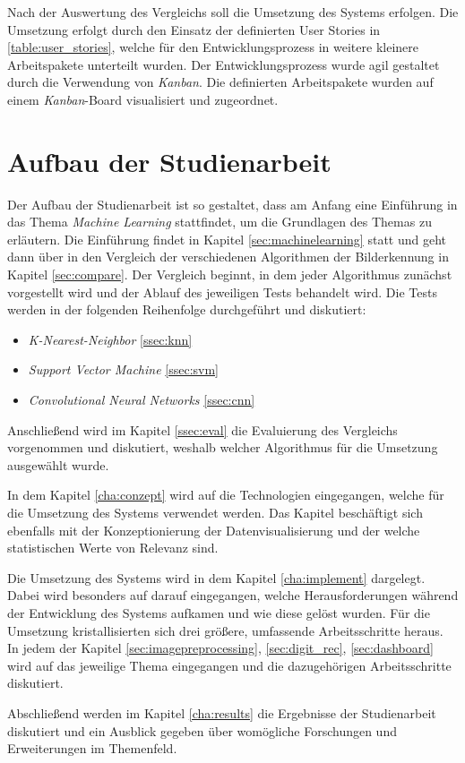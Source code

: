 Nach der Auswertung des Vergleichs soll die Umsetzung des Systems erfolgen. Die Umsetzung erfolgt durch den Einsatz der definierten User Stories in \ref{table:user_stories}, welche für den Entwicklungsprozess in weitere kleinere Arbeitspakete unterteilt wurden. Der Entwicklungsprozess wurde agil gestaltet durch die Verwendung von \textit{Kanban}. Die definierten Arbeitspakete wurden auf einem \textit{Kanban}-Board visualisiert und zugeordnet.

\section{Aufbau der Studienarbeit}
Der Aufbau der Studienarbeit ist so gestaltet, dass am Anfang eine Einführung in das Thema \textit{Machine Learning} stattfindet, um die Grundlagen des Themas zu erläutern. Die Einführung findet in Kapitel \ref{sec:machinelearning} statt und geht dann über in den Vergleich der verschiedenen Algorithmen der Bilderkennung in Kapitel \ref{sec:compare}. Der Vergleich beginnt, in dem jeder Algorithmus zunächst vorgestellt wird und der Ablauf des jeweiligen Tests behandelt wird. Die Tests werden in der folgenden Reihenfolge durchgeführt und diskutiert:
\begin{itemize}
    \item \textit{K-Nearest-Neighbor} \ref{ssec:knn}
    \item \textit{Support Vector Machine} \ref{ssec:svm}
    \item \textit{Convolutional Neural Networks} \ref{ssec:cnn}
\end{itemize}

Anschließend wird im Kapitel \ref{ssec:eval} die Evaluierung des Vergleichs vorgenommen und diskutiert, weshalb welcher Algorithmus für die Umsetzung ausgewählt wurde.

In dem Kapitel \ref{cha:conzept} wird auf die Technologien eingegangen, welche für die Umsetzung des Systems verwendet werden. Das Kapitel beschäftigt sich ebenfalls mit der Konzeptionierung der Datenvisualisierung und der welche statistischen Werte von Relevanz sind.

Die Umsetzung des Systems wird in dem Kapitel \ref{cha:implement} dargelegt. Dabei wird besonders auf darauf eingegangen, welche Herausforderungen während der Entwicklung des Systems aufkamen und wie diese gelöst wurden. Für die Umsetzung kristallisierten sich drei größere, umfassende Arbeitsschritte heraus. In jedem der Kapitel \ref{sec:imagepreprocessing}, \ref{sec:digit_rec}, \ref{sec:dashboard} wird auf das jeweilige Thema eingegangen und die dazugehörigen Arbeitsschritte diskutiert.

Abschließend werden im Kapitel \ref{cha:results} die Ergebnisse der Studienarbeit diskutiert und ein Ausblick gegeben über womögliche Forschungen und Erweiterungen im Themenfeld.